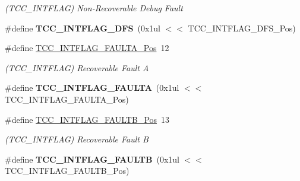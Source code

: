 \begin{DoxyCompactItemize}
\begin{DoxyCompactList}\small\item\em (T\+C\+C\+\_\+\+I\+N\+T\+F\+L\+A\+G) Non-\/\+Recoverable Debug Fault \end{DoxyCompactList}\item 
\hypertarget{group___s_a_m_l21___t_c_c_ga4bdc51e81e4ef08433f5dc66f0c6718b}{}\#define {\bfseries T\+C\+C\+\_\+\+I\+N\+T\+F\+L\+A\+G\+\_\+\+D\+F\+S}~(0x1ul $<$$<$ T\+C\+C\+\_\+\+I\+N\+T\+F\+L\+A\+G\+\_\+\+D\+F\+S\+\_\+\+Pos)\label{group___s_a_m_l21___t_c_c_ga4bdc51e81e4ef08433f5dc66f0c6718b}

\item 
\hypertarget{group___s_a_m_l21___t_c_c_gae435a9a4a0e783e20af17b5b1dd46b02}{}\#define \hyperlink{group___s_a_m_l21___t_c_c_gae435a9a4a0e783e20af17b5b1dd46b02}{T\+C\+C\+\_\+\+I\+N\+T\+F\+L\+A\+G\+\_\+\+F\+A\+U\+L\+T\+A\+\_\+\+Pos}~12\label{group___s_a_m_l21___t_c_c_gae435a9a4a0e783e20af17b5b1dd46b02}

\begin{DoxyCompactList}\small\item\em (T\+C\+C\+\_\+\+I\+N\+T\+F\+L\+A\+G) Recoverable Fault A \end{DoxyCompactList}\item 
\hypertarget{group___s_a_m_l21___t_c_c_gad7b4237bdced66cb9c769157f2b2c465}{}\#define {\bfseries T\+C\+C\+\_\+\+I\+N\+T\+F\+L\+A\+G\+\_\+\+F\+A\+U\+L\+T\+A}~(0x1ul $<$$<$ T\+C\+C\+\_\+\+I\+N\+T\+F\+L\+A\+G\+\_\+\+F\+A\+U\+L\+T\+A\+\_\+\+Pos)\label{group___s_a_m_l21___t_c_c_gad7b4237bdced66cb9c769157f2b2c465}

\item 
\hypertarget{group___s_a_m_l21___t_c_c_ga4d9b6e095df22778bf1c754489b48ece}{}\#define \hyperlink{group___s_a_m_l21___t_c_c_ga4d9b6e095df22778bf1c754489b48ece}{T\+C\+C\+\_\+\+I\+N\+T\+F\+L\+A\+G\+\_\+\+F\+A\+U\+L\+T\+B\+\_\+\+Pos}~13\label{group___s_a_m_l21___t_c_c_ga4d9b6e095df22778bf1c754489b48ece}

\begin{DoxyCompactList}\small\item\em (T\+C\+C\+\_\+\+I\+N\+T\+F\+L\+A\+G) Recoverable Fault B \end{DoxyCompactList}\item 
\hypertarget{group___s_a_m_l21___t_c_c_ga39911ba0f1b7575d42cfe1887742c1e9}{}\#define {\bfseries T\+C\+C\+\_\+\+I\+N\+T\+F\+L\+A\+G\+\_\+\+F\+A\+U\+L\+T\+B}~(0x1ul $<$$<$ T\+C\+C\+\_\+\+I\+N\+T\+F\+L\+A\+G\+\_\+\+F\+A\+U\+L\+T\+B\+\_\+\+Pos)\label{group___s_a_m_l21___t_c_c_ga39911ba0f1b7575d42cfe1887742c1e9}


\end{DoxyCompactItemize}
